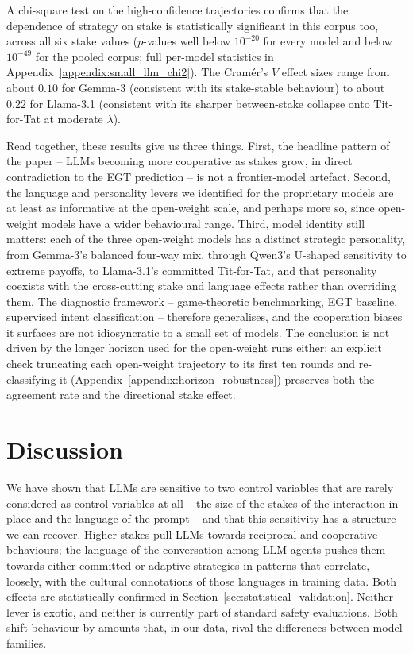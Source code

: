 \documentclass[a4paper,fleqn]{cas-sc}
\begin{document}
A chi-square test on the high-confidence trajectories confirms that the dependence of strategy on stake is statistically significant in this corpus too, across all six stake values ($p$-values well below $10^{-20}$ for every model and below $10^{-49}$ for the pooled corpus; full per-model statistics in Appendix~\ref{appendix:small_llm_chi2}). The Cram\'er's $V$ effect sizes range from about $0.10$ for Gemma-3 (consistent with its stake-stable behaviour) to about $0.22$ for Llama-3.1 (consistent with its sharper between-stake collapse onto Tit-for-Tat at moderate $\lambda$).

Read together, these results give us three things. First, the headline pattern of the paper -- LLMs becoming more cooperative as stakes grow, in direct contradiction to the EGT prediction -- is not a frontier-model artefact. Second, the language and personality levers we identified for the proprietary models are at least as informative at the open-weight scale, and perhaps more so, since open-weight models have a wider behavioural range. Third, model identity still matters: each of the three open-weight models has a distinct strategic personality, from Gemma-3's balanced four-way mix, through Qwen3's U-shaped sensitivity to extreme payoffs, to Llama-3.1's committed Tit-for-Tat, and that personality coexists with the cross-cutting stake and language effects rather than overriding them. The diagnostic framework -- game-theoretic benchmarking, EGT baseline, supervised intent classification -- therefore generalises, and the cooperation biases it surfaces are not idiosyncratic to a small set of models. The conclusion is not driven by the longer horizon used for the open-weight runs either: an explicit check truncating each open-weight trajectory to its first ten rounds and re-classifying it (Appendix~\ref{appendix:horizon_robustness}) preserves both the agreement rate and the directional stake effect.

\FloatBarrier


\section{Discussion}\label{sec:discussion}



We have shown that LLMs are sensitive to two control variables that are rarely considered  as control variables at all -- the size of the stakes of the interaction in place and the language of the prompt -- and that this sensitivity has a structure we can recover. Higher stakes pull LLMs towards reciprocal and cooperative behaviours; the language of the conversation among LLM agents pushes them towards either committed or adaptive strategies in patterns that correlate, loosely, with the cultural connotations of those languages in training data. Both effects are statistically confirmed in Section~\ref{sec:statistical_validation}. Neither lever is exotic, and neither is currently part of standard safety evaluations. Both shift behaviour by amounts that, in our data, rival the differences between model families.
\end{document}

